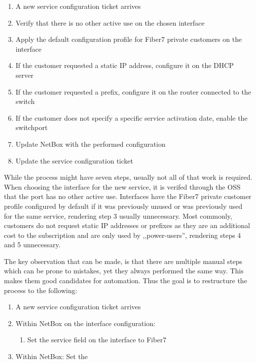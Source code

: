 \begin{enumerate}
  \item A new service configuration ticket arrives
  \item Verify that there is no other active use on the chosen interface
  \item Apply the default configuration profile for Fiber7 private customers on the interface
  \item If the customer requested a static IP address, configure it on the DHCP server
  \item If the customer requested a prefix, configure it on the router connected to the switch
  \item If the customer does not specify a specific service activation date, enable the switchport
  \item Update NetBox with the performed configuration
  \item Update the service configuration ticket
\end{enumerate}

While the process might have seven steps, usually not all of that work is required.
When choosing the interface for the new service, it is verifed through the \acrshort{OSS}
that the port has no other active use.
Interfaces have the Fiber7 private customer profile configured by default
if it was previously unused or was previously used for the same service,
rendering step 3 usually unnecessary.
Most commonly, customers do not request static IP addresses or prefixes as
they are an additional cost to the subscription and are only used by ,,power-users'',
rendering steps 4 and 5 unnecessary.

The key observation that can be made, is that there are multiple manual steps
which can be prone to mistakes, yet they always performed the same way. This makes
them good candidates for automation. Thus the goal is to restructure the process
to the following:

\begin{enumerate}
  \item A new service configuration ticket arrives
  \item Within NetBox on the interface configuration:
  \begin{enumerate}
    \item Set the service field on the interface to Fiber7
  \end{enumerate} 
  \item Within NetBox: Set the 
\end{enumerate}


